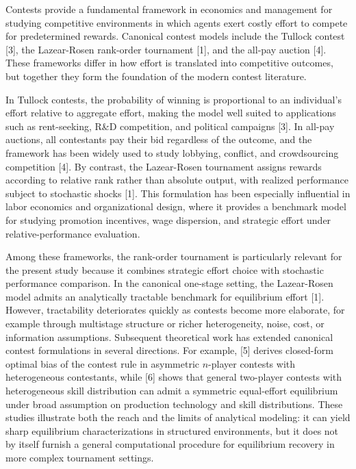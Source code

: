 \documentclass[
]{article}
\begin{document}
Contests provide a fundamental framework in economics and management for
studying competitive environments in which agents exert costly effort to
compete for predetermined rewards. Canonical contest models include the
Tullock contest {[}3{]}, the Lazear-Rosen rank-order tournament {[}1{]},
and the all-pay auction {[}4{]}. These frameworks differ in how effort
is translated into competitive outcomes, but together they form the
foundation of the modern contest literature.

In Tullock contests, the probability of winning is proportional to an
individual's effort relative to aggregate effort, making the model well
suited to applications such as rent-seeking, R\&D competition, and
political campaigns {[}3{]}. In all-pay auctions, all contestants pay
their bid regardless of the outcome, and the framework has been widely
used to study lobbying, conflict, and crowdsourcing competition {[}4{]}.
By contrast, the Lazear-Rosen tournament assigns rewards according to
relative rank rather than absolute output, with realized performance
subject to stochastic shocks {[}1{]}. This formulation has been
especially influential in labor economics and organizational design,
where it provides a benchmark model for studying promotion incentives,
wage dispersion, and strategic effort under relative-performance
evaluation.

Among these frameworks, the rank-order tournament is particularly
relevant for the present study because it combines strategic effort
choice with stochastic performance comparison. In the canonical
one-stage setting, the Lazear-Rosen model admits an analytically
tractable benchmark for equilibrium effort {[}1{]}. However,
tractability deteriorates quickly as contests become more elaborate, for
example through multistage structure or richer heterogeneity, noise,
cost, or information assumptions. Subsequent theoretical work has
extended canonical contest formulations in several directions. For
example, {[}5{]} derives closed-form optimal bias of the contest rule in
asymmetric \(n\)-player contests with heterogeneous contestants, while
{[}6{]} shows that general two-player contests with heterogeneous skill
distribution can admit a symmetric equal-effort equilibrium under broad
assumption on production technology and skill distributions. These
studies illustrate both the reach and the limits of analytical modeling:
it can yield sharp equilibrium characterizations in structured
environments, but it does not by itself furnish a general computational
procedure for equilibrium recovery in more complex tournament settings.
\end{document}
